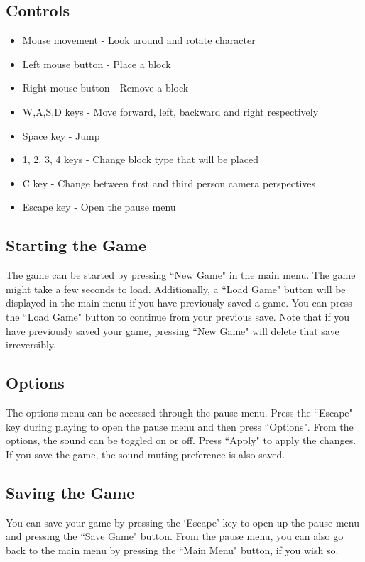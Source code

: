 \documentclass{report}
\begin{document}
\subsection{Controls}
\begin{itemize}
	\item Mouse movement - Look around and rotate character
	\item Left mouse button - Place a block
	\item Right mouse button - Remove a block
	\item W,A,S,D keys - Move forward, left, backward and right respectively
	\item Space key - Jump
	\item 1, 2, 3, 4 keys - Change block type that will be placed
	\item C key - Change between first and third person camera perspectives
	\item Escape key - Open the pause menu
\end{itemize}
\subsection{Starting the Game}
The game can be started by pressing ``New Game" in the main menu. The game might take a few seconds to load. Additionally, a ``Load Game" button will be displayed in the main menu if you have previously saved a game. You can press the ``Load Game" button to continue from your previous save. Note that if you have previously saved your game, pressing ``New Game" will delete that save irreversibly.
\subsection{Options}
The options menu can be accessed through the pause menu. Press the ``Escape" key during playing to open the pause menu and then press ``Options". From the options, the sound can be toggled on or off. Press ``Apply" to apply the changes. If you save the game, the sound muting preference is also saved.
\subsection{Saving the Game}
You can save your game by pressing the `Escape' key to open up the pause menu and pressing the ``Save Game" button. From the pause menu, you can also go back to the main menu by pressing the ``Main Menu" button, if you wish so.
\end{document}
